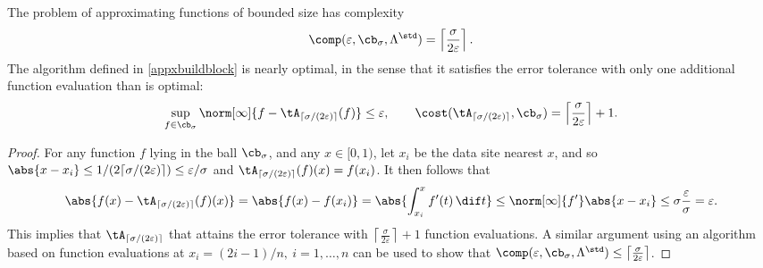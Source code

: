 \begin{theorem} \label{stdappxthm}  The problem of approximating functions of bounded size has complexity
\[
\comp(\varepsilon,\cb_{\sigma},\Lambda^{\std}) = \left \lceil \frac{\sigma}{2\varepsilon} \right \rceil.
\]
The algorithm defined in \eqref{appxbuildblock} is nearly optimal, in the sense that it satisfies the error tolerance with only one additional function evaluation than is optimal:
\[
\sup_{f \in \cb_{\sigma}} \norm[\infty]{f - \tA_{\lceil\sigma/(2\varepsilon)\rceil}(f)} \le \varepsilon, \qquad \cost(\tA_{\lceil\sigma/(2\varepsilon)\rceil},\cb_{\sigma}) = \left \lceil \frac{\sigma}{2\varepsilon} \right \rceil + 1.
\]
\end{theorem}
\begin{proof}  For any function $f$ lying in the ball $\cb_\sigma$, and any $x \in [0,1)$, let $x_i$ be the data site nearest $x$, and so $\abs{x-x_i} \le 1/(2\lceil\sigma/(2\varepsilon)\rceil) \le \varepsilon/\sigma$ and $\tA_{\lceil\sigma/(2\varepsilon)\rceil}(f)(x)=f(x_i)$. It then follows that
\begin{equation*}
\abs{f(x) - \tA_{\lceil\sigma/(2\varepsilon)\rceil}(f)(x)}=\abs{f(x) - f(x_i)} = \abs{\int_{x_i}^x f'(t) \, \dif t} \le \norm[\infty]{f'} \abs{x-x_i} \le  \sigma \frac{\varepsilon}{\sigma} = \varepsilon.
\end{equation*}
This implies that $\tA_{\lceil\sigma/(2\varepsilon)\rceil}$ that attains the error tolerance with  $\left \lceil \frac{\sigma}{2\varepsilon} \right \rceil + 1$ function evaluations.  A similar argument using an algorithm based on function evaluations at $x_i=(2i-1)/n,\ i=1, \ldots, n$ can be used to show that $\comp(\varepsilon,\cb_{\sigma},\Lambda^{\std}) \le \left \lceil \frac{\sigma}{2\varepsilon} \right \rceil$.


\end{proof}
